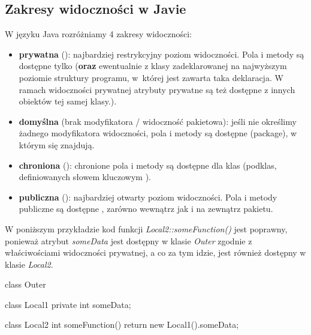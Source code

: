 \subsection{Zakresy widoczności w Javie}
W języku Java rozróżniamy 4 zakresy widoczności:
\begin{itemize}
    \item \textbf{prywatna} (): najbardziej restrykcyjny poziom widoczności. Pola i metody są dostępne tylko  (\textbf{oraz} ewentualnie z klasy zadeklarowanej na najwyższym poziomie struktury programu, w~której jest zawarta taka deklaracja. W ramach widoczności prywatnej atrybuty prywatne są też dostępne z innych obiektów tej samej klasy.). 
    \item \textbf{domyślna} (brak modyfikatora / widoczność pakietowa): jeśli nie określimy żadnego modyfikatora widoczności, pola i metody są dostępne  (package), w którym się znajdują.
    \item \textbf{chroniona} (): chronione pola i metody są dostępne dla klas  (podklas, definiowanych słowem kluczowym ).
    \item \textbf{publiczna} (): najbardziej otwarty poziom widoczności. Pola i metody publiczne są dostępne , zarówno wewnątrz jak i na zewnątrz pakietu.
\end{itemize}

\begin{example}
W poniższym przykładzie kod funkcji \textit{Local2::someFunction()} jest poprawny, ponieważ atrybut \textit{someData} jest dostępny w klasie \textit{Outer} zgodnie z właściwościami widoczności prywatnej, a co za tym idzie, jest również dostępny w klasie \textit{Local2}.
\begin{java}
    class Outer {
    
        class Local1 {
            private int someData;
        }
        
        class Local2 {
            int someFunction() {
                return new Local1().someData;
            }
        }
    }
\end{java}
\end{example}

